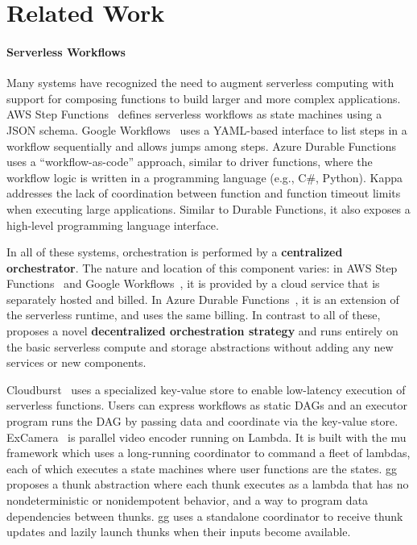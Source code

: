 \section{Related Work}\label{sec:related}

\paragraph{Serverless Workflows}

Many systems have recognized the need to augment serverless computing with
support for composing functions to build larger and more complex applications.
AWS Step Functions~\cite{aws-step-functions} defines serverless workflows as
state machines using a JSON schema. Google Workflows~\cite{google-workflows}
uses a YAML-based interface to list steps in a workflow sequentially and
allows jumps among steps. Azure Durable Functions~\cite{durable-functions}
uses a ``workflow-as-code'' approach, similar to driver functions, where the
workflow logic is written in a programming language (e.g., C\#, Python).
Kappa~\cite{kappa} addresses the lack of coordination between function and
function timeout limits when executing large applications. Similar to Durable
Functions, it also exposes a high-level programming language interface.

In all of these systems, orchestration is performed 
by a \textbf{centralized orchestrator}. The nature and location of this component varies:
in AWS Step Functions~\cite{aws-step-functions} and Google Workflows~\cite{google-workflows},
it is provided by a cloud service that is separately hosted and billed.
In Azure Durable Functions~\cite{durable-functions}, it is an
extension of the serverless runtime, and uses the same billing. In contrast to all of these,
 \name{} proposes a novel \textbf{decentralized orchestration strategy} and runs entirely
on the basic serverless
compute and storage abstractions without adding any new services or new components.


Cloudburst~\cite{cloudburst} uses a specialized key-value store to enable
low-latency execution of serverless functions. Users can express workflows as
static DAGs and an executor program runs the DAG by passing data and
coordinate via the key-value store. ExCamera~\cite{excamera} is parallel video
encoder running on Lambda. It is built with the mu framework which uses a
long-running coordinator to command a fleet of lambdas, each of which executes
a state machines where user functions are the states. gg~\cite{gg-atc}
proposes a thunk abstraction where each thunk executes as a lambda that has no
nondeterministic or nonidempotent behavior, and a way to program data
dependencies between thunks. gg uses a standalone coordinator to receive thunk
updates and lazily launch thunks when their inputs become available.

